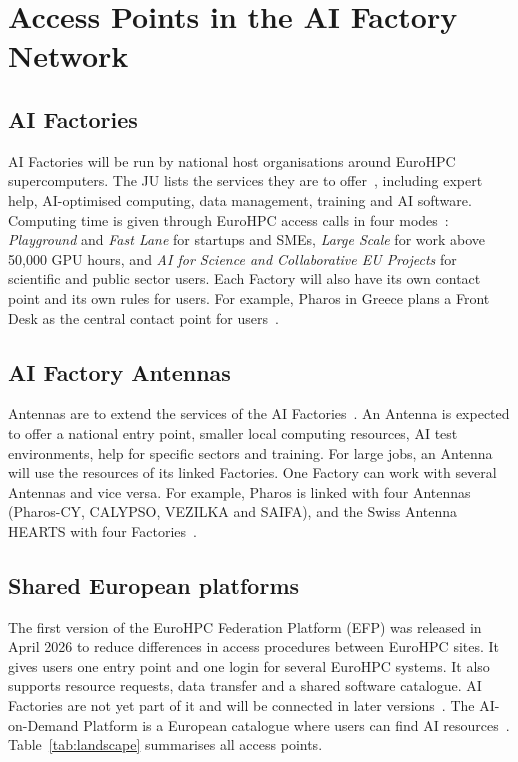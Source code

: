 \documentclass[conference,a4paper]{IEEEtran}
\newif\ifizmene
\DeclareRobustCommand{\chg}[1]{\ifizmene{\color{blue}#1}\else#1\fi}
\DeclareRobustCommand{\roz}[1]{\ifizmene{\color{roze}#1}\else#1\fi}
\DeclareRobustCommand{\nov}[1]{\ifizmene{\color{nova}#1}\else#1\fi}
\begin{document}
\section{\nov{Access Points in the AI Factory Network}}
\label{sec:access}

\subsection{AI Factories}
AI Factories \nov{will be} run by national host organisations around EuroHPC supercomputers. The JU lists the services they \nov{are to} offer~\cite{eurohpc_aif_services}\nov{, including expert help, AI-optimised computing, data management, training and AI software}. Computing time is given through EuroHPC access calls \roz{in four modes}~\cite{eurohpc_aif_access}\roz{: \emph{Playground} and \emph{Fast Lane}} \nov{for} \roz{startups and SMEs, \emph{Large Scale}} \nov{for work above} \roz{50,000 GPU hours, and \emph{AI for Science and Collaborative EU Projects} for scientific and public sector users}. Each Factory \nov{will} also \nov{have} its own \roz{contact point} and its own rules for users. \roz{For example, Pharos in Greece} \nov{plans} \roz{a Front Desk as the central contact point for users}~\cite{eurohpc_pharos}.

\subsection{AI Factory Antennas}
Antennas \nov{are to} extend the services of \nov{the} AI Factories~\cite{eurohpc_antennas_page}. An Antenna \nov{is expected to offer} a national entry point, smaller local computing resources, AI test environments, help for specific sectors and training. \nov{For large jobs, an Antenna will use the resources of its linked Factories.} One Factory can work with several Antennas \chg{and vice versa.} \nov{For example, Pharos is linked with} four Antennas (Pharos-CY, CALYPSO, VEZILKA and SAIFA), and the Swiss Antenna HEARTS \chg{with} four Factories~\cite{eurohpc_antennas}.

\subsection{Shared European platforms}
The first version of the EuroHPC Federation Platform (EFP) was \chg{released} in April 2026 \nov{to reduce differences in access procedures between EuroHPC sites}. \roz{It gives users one entry point and one login for several EuroHPC systems.} \nov{It also supports resource requests, data transfer and a shared software catalogue.} \roz{AI Factories are not yet part of it and will be connected in later versions}~\cite{eurohpc_efp}. The AI-on-Demand Platform is a European catalogue where users can find AI resources~\cite{aiod}. Table~\ref{tab:landscape} \roz{summarises all access points}.
\end{document}
